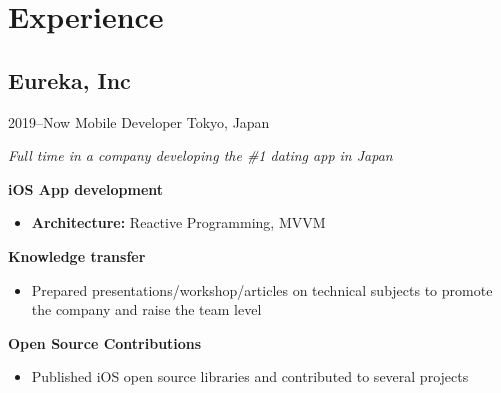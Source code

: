 \documentclass[]{template/friggeri-cv} %
\begin{document}

\section{Experience}



\subsection{Eureka, Inc}
\begin{entrylist}


\entry
{2019--Now}
{Mobile Developer}
{Tokyo, Japan}
{\emph{Full time in a company developing the \#1 dating app in Japan}

\textbf{iOS App development} 
\begin{itemize}
\item \textbf{Architecture:} Reactive Programming, MVVM
\end{itemize}

\textbf{Knowledge transfer} 
\begin{itemize}
\item Prepared presentations/workshop/articles on technical subjects to promote the company and raise the team level

\end{itemize}

\textbf{Open Source Contributions} 
\begin{itemize}
\item Published iOS open source libraries and contributed to several projects

\end{itemize}


}
\end{entrylist}
\end{document}
